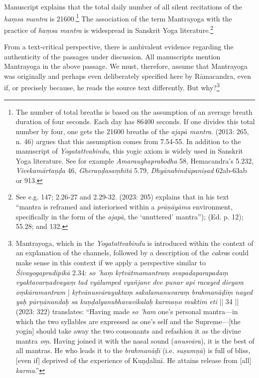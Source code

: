 Manuscript  explains that the total daily number of all silent recitations of the \textit{haṃsa mantra} is 21600.\footnote{The number of total breaths is based on the assumption of an average breath duration of four seconds. Each day has 86400 seconds. If one divides this total number by four, one gets the 21600 breaths of the \textit{ajapā mantra}. \citeauthor{birch2013} (2013: 265, n. 46) argues that this assumption comes from  7.54-55. In addition to the  manuscript of \textit{Yogatattvabindu}, this yogic axiom is widely used in Sanskrit Yoga literature. See for example \textit{Amaraughaprabodha} 58, Hemacandra's  5.232, \textit{Vivekamārtaṇḍa} 46, \textit{Gheraṇḍasaṃhitā} 5.79, \textit{Dhyānabindūpaniṣad} 62ab-63ab or  913.} The association of the term Mantrayoga with the practice of \textit{haṃsa mantra} is widespread in Sanskrit Yoga literature.\footnote{See e.g.  147;  2.26-27 and 2.29-32. \citeauthor{powell2023} (2023: 205) explains that in his text ``mantra is reframed and interiorised within a \textit{prāṇāyāma} environment, specifically in the form of the \textit{ajapā}, the `unuttered' mantra'');  (Ed. p. 12);  55.28; and  132.}

From a text-critical perspective, there is ambivalent evidence regarding the authenticity of the passages under discussion. All manuscripts mention Mantrayoga in the above passage. We must, therefore, assume that Mantrayoga was originally and perhaps even deliberately specified here by Rāmacandra, even if, or precisely because, he reads the source text differently. But why?\footnote{Mantrayoga, which in the \textit{Yogatattvabindu}  is introduced within the context of an explanation of the channels, followed by a description of the \textit{cakra}s could make sense in this context if we apply a perspective similar to \emph{Śivayogapradīpikā} 2.34: \textit{so 'haṃ kṛtvātmamantraṃ svapadaparapadaṃ vyaktavarṇadvayaṃ tad vyālumped vyañjane dve punar api racayed divyam oṃkāramantram} | \textit{kṛtvānusvārayuktaṃ sakalamanuvaraṃ brahmanāḍīṃ nayed yaḥ pūrṇānandaḥ sa kuṇḍalyanubhavavikalaḥ karmaṇo muktim eti} || 34 || \citeauthor{powell2023} (2023: 322) translates: ``Having made \textit{so ’ham} one’s personal mantra—in which the two syllables are expressed as one's self and the Supreme—[the yogin] should take away the two consonants and refashion it as the divine mantra \textit{oṃ}. Having joined it with the nasal sound (\textit{anusvāra}), it is the best of all mantras. He who leads it to the \textit{brahmanāḍī} (i.e. \textit{suṣumṇā}) is full of bliss, [even if] deprived of the experience of Kuṇḍalinī. He attains release from [all] \textit{karma}.''} 

